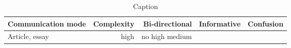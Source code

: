 \begin{table*}\centering
{}
\begin{tabular}{@{}lrrrr@{}}\toprule
Communication mode & Complexity & Bi-directional & Informative  & Confusion
\\\midrule
Article, essay & high & no
high
medium
 \\

\bottomrule
\end{tabular}
\caption{Caption}
\end{table*}